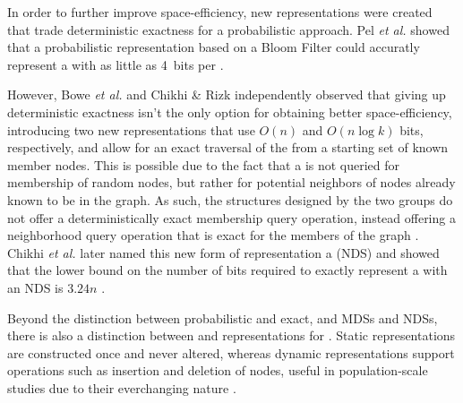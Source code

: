 In order to further improve space-efficiency, new representations were created that trade deterministic exactness for a probabilistic approach. Pel \emph{et al.} showed that a probabilistic representation based on a Bloom Filter could accuratly represent a \dBG with as little as 4~bits per \kmer \cite{Pell2012}.

However, Bowe \emph{et al.} \cite{Bowe2012} and Chikhi \& Rizk \cite{Chikhi2013} independently observed that giving up deterministic exactness isn't the only option for obtaining better space-efficiency, introducing two new representations that use $O(n)$ and $O(n \log k)$ bits, respectively, and allow for an exact traversal of the \dBG from a starting set of known member nodes. This is possible due to the fact that a \dBG is not queried for membership of random nodes, but rather for potential neighbors of nodes already known to be in the graph. As such, the structures designed by the two groups do not offer a deterministically exact membership query operation, instead offering a neighborhood query operation that is exact for the members of the graph \cite{Bowe2012, Chikhi2013}. Chikhi \emph{et al.} later named this new form of representation a  (NDS) and showed that the lower bound on the number of bits required to exactly represent a \dBG with an NDS is $3.24n$ \cite{Chikhi2014}.

Beyond the distinction between probabilistic and exact, and MDSs and NDSs, there is also a distinction between  and  representations for \dBG. Static representations are constructed once and never altered, whereas dynamic representations support operations such as insertion and deletion of nodes, useful in population-scale studies due to their everchanging nature \cite{Alipanahi2021}.



